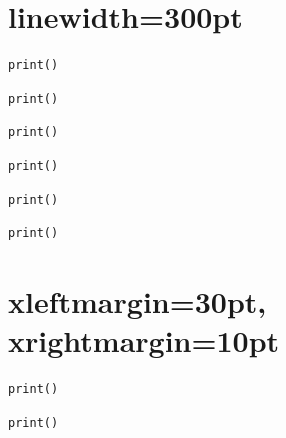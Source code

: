 \documentclass[a4paper,11pt]{article}
\makeatletter
\let\@makecaption@ORI\@makecaption
\let\lst@MakeCaption@ORI\lst@MakeCaption
\let\@makecaption@CAPTION\@makecaption
\let\lst@MakeCaption@CAPTION\lst@MakeCaption}
\newcommand\Original{\let\@makecaption\@makecaption@ORI\let\lst@MakeCaption\lst@MakeCaption@ORI}
\newcommand\Caption{\let\@makecaption\@makecaption@CAPTION\let\lst@MakeCaption\lst@MakeCaption@CAPTION}
\makeatother
\begin{document}
\clearpage
\section*{linewidth=300pt}

\Original

\begin{lstlisting}[linewidth=300pt,caption=Some caption,captionpos=t]
print()
\end{lstlisting}

\begin{lstlisting}[linewidth=300pt,caption=Some caption,captionpos=b]
print()
\end{lstlisting}

\Caption\captionsetup{box=none}

\begin{lstlisting}[linewidth=300pt,caption=Some caption,captionpos=t]
print()
\end{lstlisting}

\begin{lstlisting}[linewidth=300pt,caption=Some caption,captionpos=b]
print()
\end{lstlisting}

\captionsetup{box=colorbox,boxcolor=orange!20}

\begin{lstlisting}[linewidth=300pt,caption=Some caption,captionpos=t]
print()
\end{lstlisting}

\begin{lstlisting}[linewidth=300pt,caption=Some caption,captionpos=b]
print()
\end{lstlisting}

\clearpage
\section*{xleftmargin=30pt, xrightmargin=10pt}

\Original

\begin{lstlisting}[xleftmargin=30pt,xrightmargin=10pt,caption=Some caption,captionpos=t]
print()
\end{lstlisting}

\begin{lstlisting}[xleftmargin=30pt,xrightmargin=10pt,caption=Some caption,captionpos=b]
print()
\end{lstlisting}

\Caption\captionsetup{box=none}
\end{document}
